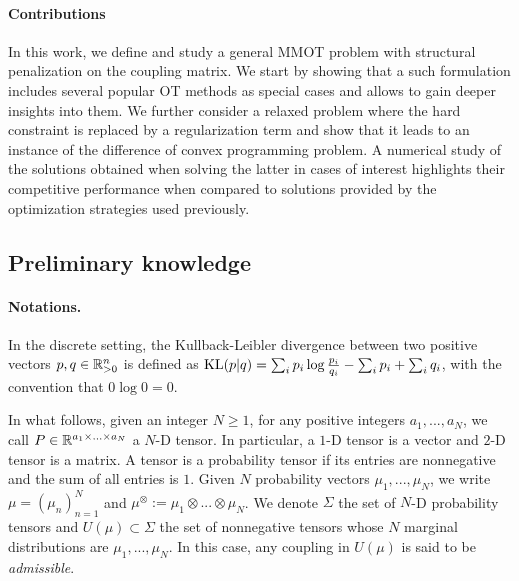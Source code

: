 \paragraph{Contributions} In this work, we define and study a general MMOT problem with structural penalization on the coupling matrix.
We start by showing that a such formulation includes several popular OT methods as special cases and allows to gain deeper insights
into them. We further consider a relaxed problem where the hard constraint is replaced by a regularization term and show that it leads
to an instance of the difference of convex programming problem. A numerical study of the solutions obtained when solving the latter
in cases of interest highlights their competitive performance when compared to solutions provided by the optimization
strategies used previously.

\subsection{Preliminary knowledge}

\paragraph{Notations.} In the discrete setting, the
Kullback-Leibler divergence between two positive vectors $p, q \in \mathbb R^n_{> 0}$
is defined as $\text{KL}(p | q) = \sum_i p_i \log \frac{p_i}{q_i} - \sum_i p_i + \sum_i q_i$,
with the convention that $0 \log 0 = 0$.

In what follows, given an integer $N \geq 1$, for any positive integers $a_1,..., a_N$, we call
$P \in \mathbb R^{a_1 \times ... \times a_N}$ a $N$-D tensor. In particular, a $1$-D tensor is a vector and $2$-D tensor is a matrix.
A tensor is a probability tensor if its entries are nonnegative and the sum of all entries is $1$.
Given $N$ probability vectors $\mu_1, ..., \mu_N$, we write $\mu = (\mu_n)_{n=1}^N$
and $\mu^{\otimes} := \mu_1 \otimes ... \otimes \mu_N$.
We denote $\Sigma$ the set of $N$-D probability tensors and $U(\mu) \subset \Sigma$ the set of nonnegative tensors whose $N$
marginal distributions are $\mu_1, ..., \mu_N$. In this case, any coupling in $U(\mu)$ is said to be \textit{admissible}.

